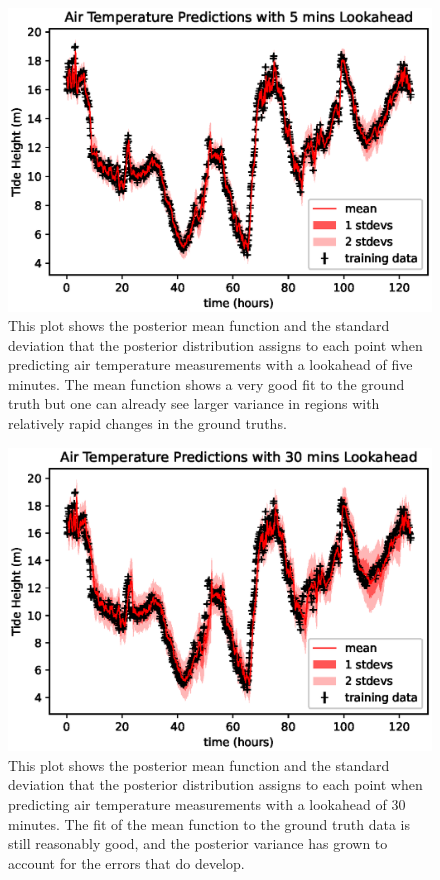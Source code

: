\documentclass{article}
\begin{document}
                \begin{figure}[ht!]
                    \includegraphics[width=\linewidth,height=\textheight,keepaspectratio]{air_temp_lookahead_5mins.eps}
                    \caption{This plot shows the posterior mean function and the standard deviation that the posterior distribution assigns to each point when predicting air temperature measurements with a lookahead of five minutes. The mean function shows a very good fit to the ground truth but one can already see larger variance in regions with relatively rapid changes in the ground truths.}
                    \label{plot_airtemplookahead_5mins}
                \end{figure}

                \begin{figure}[ht!]
                    \includegraphics[width=\linewidth,height=\textheight,keepaspectratio]{air_temp_lookahead_30mins.eps}
                    \caption{This plot shows the posterior mean function and the standard deviation that the posterior distribution assigns to each point when predicting air temperature measurements with a lookahead of 30 minutes. The fit of the mean function to the ground truth data is still reasonably good, and the posterior variance has grown to account for the errors that do develop.}
                    \label{plot_airtemplookahead_30mins}
                \end{figure}
\end{document}
